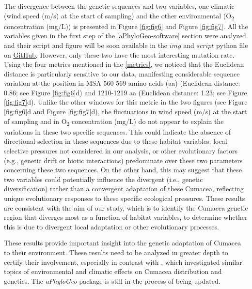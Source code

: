 {The divergence between the genetic sequences and two variables, one climatic (wind speed (m/s) at the start of sampling) and the other environmental (O\textsubscript{2} concentration (mg/L)) is presented in Figure \ref{fig:fig6} and Figure \ref{fig:fig7}. All the variables given in the first step of the \autoref{aPhyloGeo-software} section were analyzed and their script and figure will be soon available in the $img$ and $script$ python file on \href{https://github.com/tahiri-lab/Cumacea_aPhyloGeo}{GitHub}. However, only these two have the most interesting mutation rate. Using the four metrics mentioned in the \autoref{metrics}, we noticed that the Euclidean distance is particularly sensitive to our data, manifesting considerable sequence variation at the position in MSA 560-569 amino acids (aa) (Euclidean distance: 0.86; see Figure \ref{fig:fig6}d) and 1210-1219 aa (Euclidean distance: 1.23; see Figure \ref{fig:fig7}d). Unlike the other windows for this metric in the two figures (see Figure \ref{fig:fig6}d and Figure \ref{fig:fig7}d), the fluctuations in wind speed (m/s) at the start of sampling and in O\textsubscript{2} concentration (mg/L) do not appear to explain the variations in these two specific sequences. This could indicate the absence of directional selection in these sequences due to these habitat variables, local selective pressures not considered in our analysis, or other evolutionary factors (e.g., genetic drift or biotic interactions) predominate over these two parameters concerning these two sequences. On the other hand, this may suggest that these two variables could potentially influence the divergent (i.e., genetic diversification) rather than a convergent adaptation of these Cumacea, reflecting unique evolutionary responses to these specific ecological pressures. These results are consistent with the aim of our study, which is to identify the Cumacea genetic region that diverges most as a function of habitat variables, to determine whether this is due to divergent local adaptation or other evolutionary processes.

These results provide important insight into the genetic adaptation of Cumacea to their environment. These results need to be analyzed in greater depth to certify their involvement, especially in contrast with \citep{uhlir_adding_2021}, which investigated similar topics of environmental and climatic effects on Cumacea distribution and genetics. The \textit{aPhyloGeo} package is still in the process of being updated.

}
